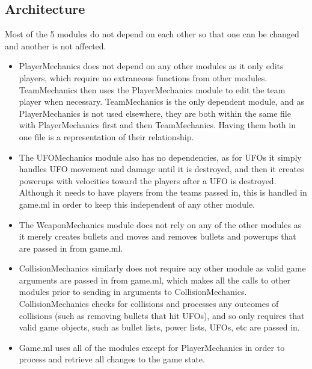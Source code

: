 \documentclass{article}
\begin{document}
\subsection{Architecture}
Most of the 5 modules do not depend on each other so that one can be changed and another is not affected. \\
\begin{itemize}
\item PlayerMechanics does not depend on any other modules as it only edits players, which require no extraneous functions from other modules. TeamMechanics then uses the PlayerMechanics module to edit the team player when necessary. TeamMechanics is the only dependent module, and as PlayerMechanics is not used elsewhere, they are both within the same file with PlayerMechanics first and then TeamMechanics. Having them both in one file is a representation of their relationship. 
\item The UFOMechanics module also has no dependencies, as for UFOs it simply handles UFO movement and damage until it is destroyed, and then it creates powerups with velocities toward the players after a UFO is destroyed. Although it needs to have players from the teams passed in, this is handled in game.ml in order to keep this independent of any other module. 
\item The WeaponMechanics module does not rely on any of the other modules as it merely creates bullets and moves and removes bullets and powerups that are passed in from game.ml.
\item CollisionMechanics similarly does not require any other module as valid game arguments are passed in from game.ml, which makes all the calls to other modules prior to sending in arguments to CollisionMechanics. CollisionMechanics checks for collisions and processes any outcomes of collisions (such as removing bullets that hit UFOs), and so only requires that valid game objects, such as bullet lists, power lists, UFOs, etc are passed in.
\item Game.ml uses all of the modules except for PlayerMechanics in order to process and retrieve all changes to the game state.
\end{itemize}
\end{document}
